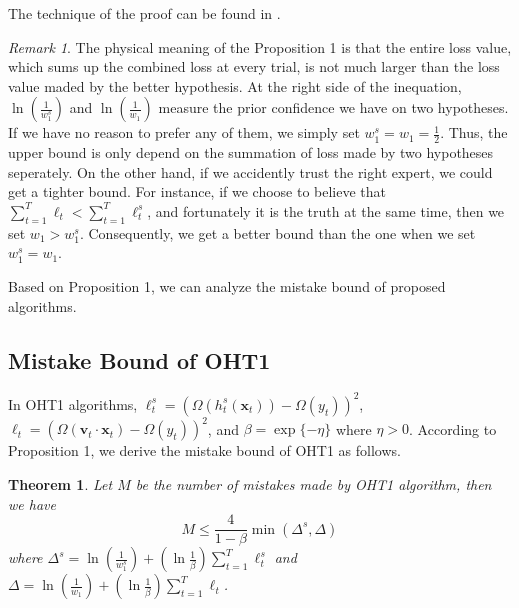 \documentclass[letterpaper]{article}
\newtheorem{thm}{Theorem}
\theoremstyle{remark}
\newtheorem*{rem}{Remark}
\theoremstyle{definition}
\begin{document}
The technique of the proof can be found in \cite{freund1995decision}.
\begin{rem}
The physical meaning of the Proposition 1 is that the entire loss value, which sums up the combined loss at every trial, is not much larger than the loss value maded by the better hypothesis.
At the right side of the inequation, $\ln(\frac{1}{w_{1}^{s}})$ and $\ln(\frac{1}{w_1})$ measure the prior confidence we have on two hypotheses.
If we have no reason to prefer any of them, we simply set $w_{1}^{s} = w_1 = \frac{1}{2}$.
Thus, the upper bound is only depend on the summation of loss made by two hypotheses seperately.
On the other hand, if we accidently trust the right expert, we could get a tighter bound.
For instance, if we choose to believe that $\sum\limits_{t=1}^{T} \ell_{t} < \sum\limits_{t=1}^{T} \ell_{t}^{s}$, and fortunately it is the truth at the same time, then we set $w_1 > w_{1}^{s}$.
Consequently, we get a better bound than the one when we set $w_{1}^{s} = w_{1}$.

Based on Proposition 1, we can analyze the mistake bound of proposed algorithms.

\end{rem}

\subsection{Mistake Bound of OHT1}

In OHT1 algorithms, $\ell_{t}^{s} = (\varOmega(h_{t}^{s}(\mathbf{x}_t)) - \varOmega(y_t)) ^ 2$, $\ell_t = (\varOmega(\mathbf{v}_t \cdot \mathbf{x}_t) - \varOmega(y_t)) ^ 2$, and $\beta = \exp\{-\eta\}$ where $\eta > 0$.
According to Proposition 1, we derive the mistake bound of OHT1 as follows.

\begin{thm}
Let $M$ be the number of mistakes made by OHT1 algorithm, then we have 
$$ M \leq \frac{4}{1-\beta} \min (\varDelta^s, \varDelta) $$
where
$ \varDelta^s = \ln(\frac{1}{w_{1}^{s}}) + (\ln \frac{1}{\beta}) \sum\limits_{t=1}^{T} \ell_{t}^{s} $ and $ \varDelta = \ln(\frac{1}{w_{1}}) + (\ln \frac{1}{\beta}) \sum\limits_{t=1}^{T} \ell_{t} $.
\end{thm}
\end{document}
